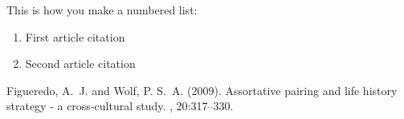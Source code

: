 \documentclass[twoside,twocolumn]{article}
\begin{document}
This is how you make a numbered list:

\begin{enumerate}
\item First article citation
\item Second article citation
\end{enumerate}



\begin{thebibliography}{99} %

Figueredo, A.~J. and Wolf, P. S.~A. (2009).
\newblock Assortative pairing and life history strategy - a cross-cultural
  study.
, 20:317--330. %
 
\end{thebibliography}

\end{document}
